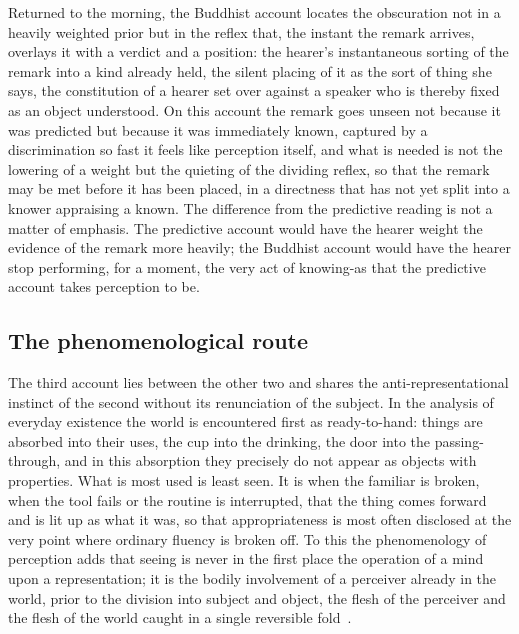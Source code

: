Returned to the morning, the Buddhist account locates the obscuration not in a heavily weighted prior but in the reflex that, the instant the remark arrives, overlays it with a verdict and a position: the hearer's instantaneous sorting of the remark into a kind already held, the silent placing of it as the sort of thing she says, the constitution of a hearer set over against a speaker who is thereby fixed as an object understood. On this account the remark goes unseen not because it was predicted but because it was immediately known, captured by a discrimination so fast it feels like perception itself, and what is needed is not the lowering of a weight but the quieting of the dividing reflex, so that the remark may be met before it has been placed, in a directness that has not yet split into a knower appraising a known. The difference from the predictive reading is not a matter of emphasis. The predictive account would have the hearer weight the evidence of the remark more heavily; the Buddhist account would have the hearer stop performing, for a moment, the very act of knowing-as that the predictive account takes perception to be.

\subsection{The phenomenological route}
\label{p22:sub:perception-phenomenological}

The third account lies between the other two and shares the anti-representational instinct of the second without its renunciation of the subject. In the analysis of everyday existence the world is encountered first as ready-to-hand: things are absorbed into their uses, the cup into the drinking, the door into the passing-through, and in this absorption they precisely do not appear as objects with properties. What is most used is least seen. It is when the familiar is broken, when the tool fails or the routine is interrupted, that the thing comes forward and is lit up as what it was, so that appropriateness is most often disclosed at the very point where ordinary fluency is broken off. To this the phenomenology of perception adds that seeing is never in the first place the operation of a mind upon a representation; it is the bodily involvement of a perceiver already in the world, prior to the division into subject and object, the flesh of the perceiver and the flesh of the world caught in a single reversible fold~\parencite{merleau_phenomenology}.

